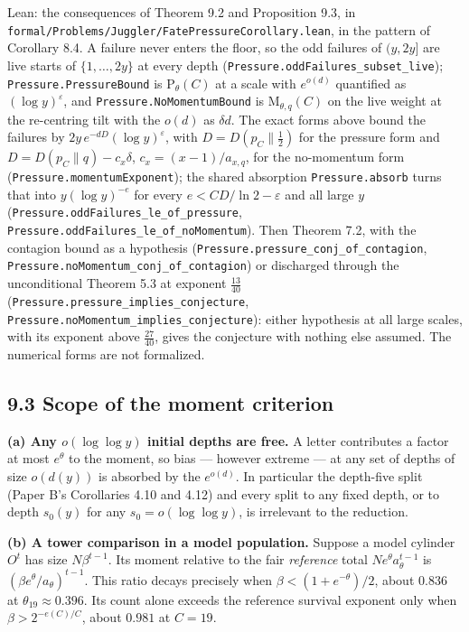 \documentclass[11pt,a4paper]{article}
\begin{document}
Lean: the consequences of Theorem 9.2 and Proposition 9.3, in
\texttt{\nolinkurl{formal/Problems/Juggler/FatePressureCorollary.lean}},
in the pattern of Corollary 8.4. A failure never enters the floor, so
the odd failures of \((y,2y]\) are live starts of \(\{1,\dots,2y\}\) at
every depth (\texttt{\nolinkurl{Pressure.oddFailures_subset_live}});
\texttt{\nolinkurl{Pressure.PressureBound}} is \(\mathrm P_\theta(C)\)
at a scale with \(e^{o(d)}\) quantified as \((\log y)^\varepsilon\), and
\texttt{\nolinkurl{Pressure.NoMomentumBound}} is
\(\mathrm M_{\theta,q}(C)\) on the live weight at the re-centring tilt
with the \(o(d)\) as \(\delta d\). The exact forms above bound the
failures by \(2y\,e^{-dD}(\log y)^\varepsilon\), with
\(D=D(p_C\|\tfrac12)\) for the pressure form and
\(D=D(p_C\|q)-c_x\delta\), \(c_x=(x-1)/a_{x,q}\), for the no-momentum
form (\texttt{\nolinkurl{Pressure.momentumExponent}}); the shared
absorption \texttt{\nolinkurl{Pressure.absorb}} turns that into
\(y(\log y)^{-e}\) for every \(e<CD/\ln2-\varepsilon\) and all large
\(y\) (\texttt{\nolinkurl{Pressure.oddFailures_le_of_pressure}},
\texttt{\nolinkurl{Pressure.oddFailures_le_of_noMomentum}}). Then
Theorem 7.2, with the contagion bound as a hypothesis
(\texttt{\nolinkurl{Pressure.pressure_conj_of_contagion}},
\texttt{\nolinkurl{Pressure.noMomentum_conj_of_contagion}}) or
discharged through the unconditional Theorem 5.3 at exponent
\(\tfrac{13}{40}\)
(\texttt{\nolinkurl{Pressure.pressure_implies_conjecture}},
\texttt{\nolinkurl{Pressure.noMomentum_implies_conjecture}}): either
hypothesis at all large scales, with its exponent above
\(\tfrac{27}{40}\), gives the conjecture with nothing else assumed. The
numerical forms are not formalized.

\subsection{9.3 Scope of the moment
criterion}\label{scope-of-the-moment-criterion}

\textbf{(a) Any \(o(\log\log y)\) initial depths are free.} A letter
contributes a factor at most \(e^\theta\) to the moment, so bias ---
however extreme --- at any set of depths of size \(o(d(y))\) is absorbed
by the \(e^{o(d)}\). In particular the depth-five split (Paper B's
Corollaries 4.10 and 4.12) and every split to any fixed depth, or to
depth \(s_0(y)\) for any \(s_0=o(\log\log y)\), is irrelevant to the
reduction.

\textbf{(b) A tower comparison in a model population.} Suppose a model
cylinder \(O^t\) has size \(N\beta^{t-1}\). Its moment relative to the
fair \emph{reference} total \(Ne^\theta a_\theta^{t-1}\) is
\((\beta e^\theta/a_\theta)^{t-1}\). This ratio decays precisely when
\(\beta<(1+e^{-\theta})/2\), about \(0.836\) at
\(\theta_{19}\approx0.396\). Its count alone exceeds the reference
survival exponent only when \(\beta>2^{-e(C)/C}\), about \(0.981\) at
\(C=19\).
\end{document}
